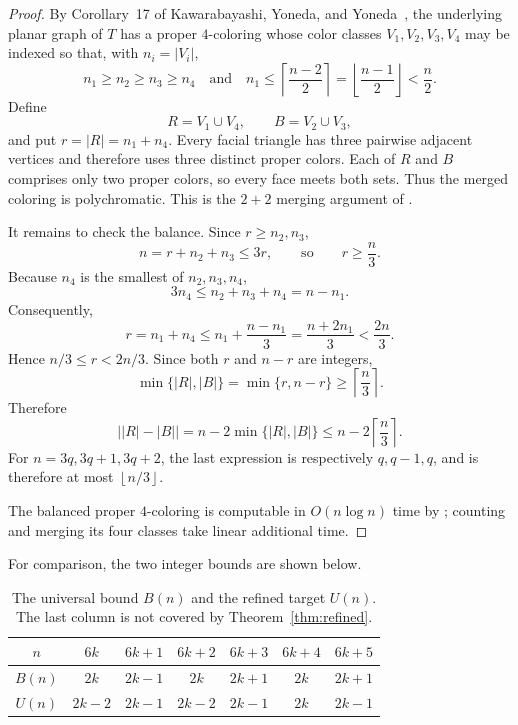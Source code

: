 \documentclass[11pt]{amsart}
\newcommand{\ceil}[1]{\left\lceil #1\right\rceil}
\newcommand{\floor}[1]{\left\lfloor #1\right\rfloor}
\begin{document}
\begin{proof}
By Corollary~17 of Kawarabayashi, Yoneda, and
Yoneda~\cite{KawarabayashiEtAl2026}, the underlying planar graph of $T$
has a proper $4$-coloring whose color classes $V_1,V_2,V_3,V_4$ may be
indexed so that, with $n_i=|V_i|$,
\[
  n_1\ge n_2\ge n_3\ge n_4
  \quad\text{and}\quad
  n_1\le \ceil{\frac{n-2}{2}}
       =\floor{\frac{n-1}{2}}
       <\frac n2.
\]
Define
\[
  R=V_1\cup V_4,
  \qquad
  B=V_2\cup V_3,
\]
and put $r=|R|=n_1+n_4$.  Every facial triangle has three pairwise
adjacent vertices and therefore uses three distinct proper colors.  Each
of $R$ and $B$ comprises only two proper colors, so every face meets both
sets.  Thus the merged coloring is polychromatic.  This is the $2+2$
merging argument of \cite[Lemma~14]{LoyolaEtAl2026}.

It remains to check the balance.  Since $r\ge n_2,n_3$,
\[
  n=r+n_2+n_3\le3r,
  \qquad\text{so}\qquad
  r\ge\frac n3.
\]
Because $n_4$ is the smallest of $n_2,n_3,n_4$,
\[
  3n_4\le n_2+n_3+n_4=n-n_1.
\]
Consequently,
\[
  r=n_1+n_4
    \le n_1+\frac{n-n_1}{3}
    =\frac{n+2n_1}{3}
    <\frac{2n}{3}.
\]
Hence $n/3\le r<2n/3$.  Since both $r$ and $n-r$ are integers,
\[
  \min\{|R|,|B|\}
  =\min\{r,n-r\}
  \ge \ceil{\frac n3}.
\]
Therefore
\[
  \bigl||R|-|B|\bigr|
  =n-2\min\{|R|,|B|\}
  \le n-2\ceil{\frac n3}.
\]
For $n=3q,3q+1,3q+2$, the last expression is respectively
$q,q-1,q$, and is therefore at most $\floor{n/3}$.

The balanced proper $4$-coloring is computable in $O(n\log n)$ time by
\cite[Corollary~17]{KawarabayashiEtAl2026}; counting and merging its four
classes take linear additional time.
\end{proof}


For comparison, the two integer bounds are shown below.

\begin{table}[H]
\centering
\small
\begin{tabular}{c|cccccc}
\toprule
$n$ & $6k$ & $6k+1$ & $6k+2$ & $6k+3$ & $6k+4$ & $6k+5$ \\
\midrule
$B(n)$ & $2k$ & $2k-1$ & $2k$ & $2k+1$ & $2k$ & $2k+1$ \\
$U(n)$ & $2k-2$ & $2k-1$ & $2k-2$ & $2k-1$ & $2k$ & $2k-1$ \\
\bottomrule
\end{tabular}
\caption{The universal bound $B(n)$ and the refined target $U(n)$.  The last
column is not covered by Theorem~\ref{thm:refined}.}
\label{tab:bounds}
\end{table}
\end{document}
